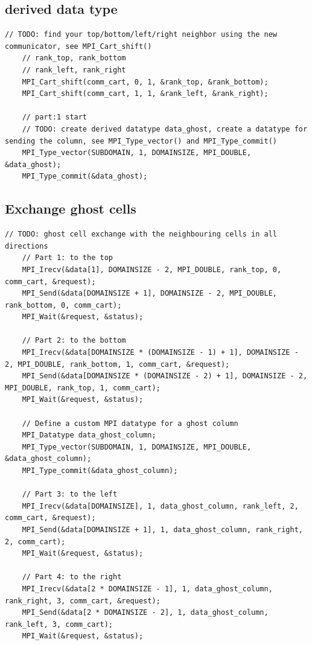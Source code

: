 \documentclass[unicode,11pt,a4paper,oneside,numbers=endperiod,openany]{scrartcl}
\begin{document}
\subsection{derived data type}
\begin{lstlisting}[style=mystyle, language=MyC++, caption={Finding Neighbors and Creating a Derived Datatype}]
    // TODO: find your top/bottom/left/right neighbor using the new communicator, see MPI_Cart_shift()
    // rank_top, rank_bottom
    // rank_left, rank_right
    MPI_Cart_shift(comm_cart, 0, 1, &rank_top, &rank_bottom);
    MPI_Cart_shift(comm_cart, 1, 1, &rank_left, &rank_right);

    // part:1 start
    // TODO: create derived datatype data_ghost, create a datatype for sending the column, see MPI_Type_vector() and MPI_Type_commit()
    MPI_Type_vector(SUBDOMAIN, 1, DOMAINSIZE, MPI_DOUBLE, &data_ghost);
    MPI_Type_commit(&data_ghost);
\end{lstlisting}
\subsection{Exchange ghost cells}
\begin{lstlisting}[style=mystyle, language=MyC++, caption={Ghost Cell Exchange with Neighboring Cells in All Directions}]
    // TODO: ghost cell exchange with the neighbouring cells in all directions
    // Part 1: to the top
    MPI_Irecv(&data[1], DOMAINSIZE - 2, MPI_DOUBLE, rank_top, 0, comm_cart, &request);
    MPI_Send(&data[DOMAINSIZE + 1], DOMAINSIZE - 2, MPI_DOUBLE, rank_bottom, 0, comm_cart);
    MPI_Wait(&request, &status);

    // Part 2: to the bottom
    MPI_Irecv(&data[DOMAINSIZE * (DOMAINSIZE - 1) + 1], DOMAINSIZE - 2, MPI_DOUBLE, rank_bottom, 1, comm_cart, &request);
    MPI_Send(&data[DOMAINSIZE * (DOMAINSIZE - 2) + 1], DOMAINSIZE - 2, MPI_DOUBLE, rank_top, 1, comm_cart);
    MPI_Wait(&request, &status);

    // Define a custom MPI datatype for a ghost column
    MPI_Datatype data_ghost_column;
    MPI_Type_vector(SUBDOMAIN, 1, DOMAINSIZE, MPI_DOUBLE, &data_ghost_column);
    MPI_Type_commit(&data_ghost_column);

    // Part 3: to the left
    MPI_Irecv(&data[DOMAINSIZE], 1, data_ghost_column, rank_left, 2, comm_cart, &request);
    MPI_Send(&data[DOMAINSIZE + 1], 1, data_ghost_column, rank_right, 2, comm_cart);
    MPI_Wait(&request, &status);

    // Part 4: to the right
    MPI_Irecv(&data[2 * DOMAINSIZE - 1], 1, data_ghost_column, rank_right, 3, comm_cart, &request);
    MPI_Send(&data[2 * DOMAINSIZE - 2], 1, data_ghost_column, rank_left, 3, comm_cart);
    MPI_Wait(&request, &status);
\end{lstlisting}
\end{document}
